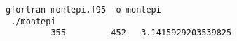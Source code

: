 \begin{Verbatim}[frame=lines,label=montepi - commands and output]
 gfortran montepi.f95 -o montepi
 ./montepi
         355         452   3.1415929203539825     
\end{Verbatim}
